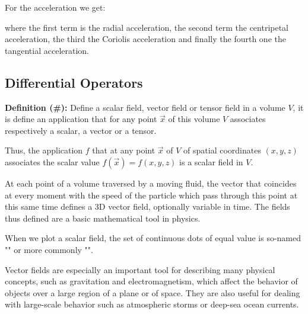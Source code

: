 	For the acceleration we get:	
	
	where the first term is the radial acceleration, the second term the centripetal acceleration, the third the Coriolis acceleration and finally the fourth one the tangential acceleration.
	
	\pagebreak
	\subsection{Differential Operators}\label{differential operators}
	\textbf{Definition (\#\mydef):} Define a scalar field, vector field or tensor field in a volume $V$, it is define an application that for any point $\vec{x}$ of this volume $V$ associates respectively a scalar, a vector or a tensor.
	
	Thus, the application $f$ that at any point $\vec{x}$ of $V$ of spatial coordinates $(x, y, z)$ associates the scalar value $f(\vec{x})=f(x,y,z)$ is a scalar field in $V$.
	
	At each point of a volume traversed by a moving fluid, the vector that coincides at every moment with the speed of the particle which pass through this point at this same time defines a 3D vector field, optionally variable in time. The fields thus defined are a basic mathematical tool in physics.
	\begin{tcolorbox}[title=Remark,colframe=black,arc=10pt]
	When we plot a scalar field, the set of continuous dots of equal value is so-named "" or more commonly "".
	\end{tcolorbox}
	Vector fields are especially an important tool for describing many physical concepts, such as gravitation and electromagnetism, which affect the behavior of objects over a large region of a plane or of space. They are also useful for dealing with large-scale behavior such as atmospheric storms or deep-sea ocean currents.

